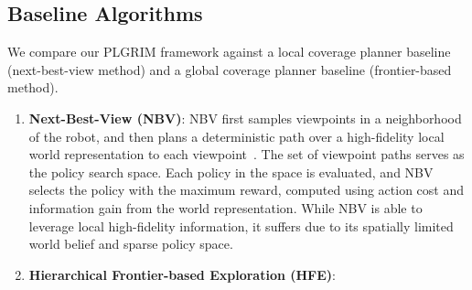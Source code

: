 \documentclass[letterpaper]{article} %
\begin{document}
\subsection{Baseline Algorithms}
We compare our PLGRIM framework against a local coverage planner baseline (next-best-view method) and a global coverage planner baseline (frontier-based method).
\vspace{-3pt}
\begin{enumerate}[label={\arabic*)}]
  \itemsep0em 
  \setlength{\itemsep}{0pt}
  \setlength{\parskip}{0pt}
  \item \textbf{Next-Best-View (NBV)}:
	NBV first samples viewpoints in a neighborhood of the robot, and then plans a deterministic path over a high-fidelity local world representation to each viewpoint~\cite{bircher2016receding}. The set of viewpoint paths serves as the policy search space. Each policy in the space is evaluated, and NBV selects the policy with the maximum reward, computed using action cost and information gain from the world representation. While NBV is able to leverage local high-fidelity information, it suffers due to its spatially limited world belief and sparse policy space.
  \item \textbf{Hierarchical Frontier-based Exploration (HFE)}:

\end{enumerate}
\end{document}
